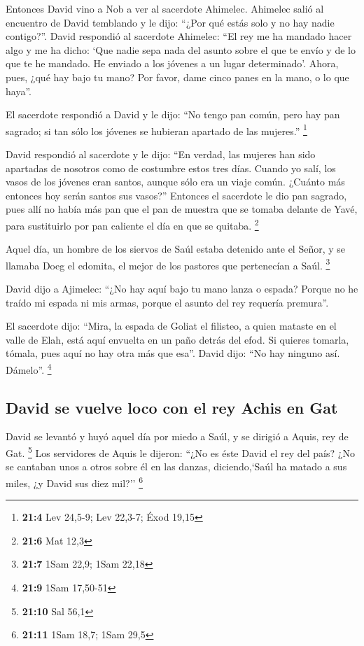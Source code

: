\begin{paracol}{2}
 Entonces David vino a Nob a ver al sacerdote Ahimelec.
Ahimelec salió al encuentro de David temblando y le dijo: ``¿Por qué
estás solo y no hay nadie contigo?''.  David respondió al
sacerdote Ahimelec: ``El rey me ha mandado hacer algo y me ha dicho:
`Que nadie sepa nada del asunto sobre el que te envío y de lo que te he
mandado. He enviado a los jóvenes a un lugar determinado'.
 Ahora, pues, ¿qué hay bajo tu mano? Por favor, dame cinco
panes en la mano, o lo que haya''.

 El sacerdote respondió a David y le dijo: ``No tengo pan
común, pero hay pan sagrado; si tan sólo los jóvenes se hubieran
apartado de las mujeres.'' \footnote{\textbf{21:4} Lev 24,5-9; Lev
  22,3-7; Éxod 19,15}

 David respondió al sacerdote y le dijo: ``En verdad, las
mujeres han sido apartadas de nosotros como de costumbre estos tres
días. Cuando yo salí, los vasos de los jóvenes eran santos, aunque sólo
era un viaje común. ¿Cuánto más entonces hoy serán santos sus vasos?''
 Entonces el sacerdote le dio pan sagrado, pues allí no
había más pan que el pan de muestra que se tomaba delante de Yavé, para
sustituirlo por pan caliente el día en que se quitaba. \footnote{\textbf{21:6}
  Mat 12,3}

 Aquel día, un hombre de los siervos de Saúl estaba
detenido ante el Señor, y se llamaba Doeg el edomita, el mejor de los
pastores que pertenecían a Saúl. \footnote{\textbf{21:7} 1Sam 22,9; 1Sam
  22,18}

 David dijo a Ajimelec: ``¿No hay aquí bajo tu mano lanza
o espada? Porque no he traído mi espada ni mis armas, porque el asunto
del rey requería premura''.

 El sacerdote dijo: ``Mira, la espada de Goliat el
filisteo, a quien mataste en el valle de Elah, está aquí envuelta en un
paño detrás del efod. Si quieres tomarla, tómala, pues aquí no hay otra
más que esa''. David dijo: ``No hay ninguno así. Dámelo''. \footnote{\textbf{21:9}
  1Sam 17,50-51}

\hypertarget{david-se-vuelve-loco-con-el-rey-achis-en-gat}{%
\subsection{David se vuelve loco con el rey Achis en
Gat}\label{david-se-vuelve-loco-con-el-rey-achis-en-gat}}

 David se levantó y huyó aquel día por miedo a Saúl, y se
dirigió a Aquis, rey de Gat. \footnote{\textbf{21:10} Sal 56,1}
 Los servidores de Aquis le dijeron: ``¿No es éste David
el rey del país? ¿No se cantaban unos a otros sobre él en las danzas,
diciendo,`Saúl ha matado a sus miles, ¿y David sus diez mil?''
\footnote{\textbf{21:11} 1Sam 18,7; 1Sam 29,5}


\end{paracol}
